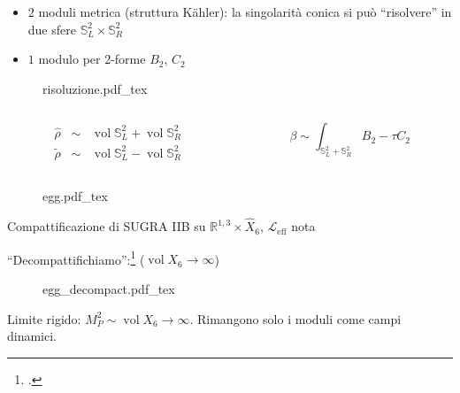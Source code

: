 \documentclass[aspectratio=43,mathserif]{beamer}
\newcommand{\rfour}{\ensuremath{\mathbb{R}^{1,3}}}
\newcommand{\ess}{\mathbb{S}}
\newcommand{\hatt}[1]{\ensuremath{\widehat{#1}}}
\newcommand{\tildd}[1]{\ensuremath{\widetilde{#1}}}
\newcommand{\vol}{\ensuremath{\operatorname{vol}}}
\newcommand{\leff}{\ensuremath{\mathcal{L}_\text{eff}}}
\begin{document}
\begin{frame}
	\begin{itemize}
		\item	$2$ moduli metrica (struttura K\"ahler): la singolarità conica si può ``risolvere'' in due sfere $\ess^2_L \times \ess^2_R$\\
			\vfill
		\item	$1$ modulo per 2-forme $B_2$, $C_2$
	\end{itemize}
	\vspace{-15pt}

	\begin{figure}[h!]\centering
		\def\svgscale{0.5}
		{risoluzione.pdf_tex}
	\end{figure}

	\vspace{-35pt}

	\begin{columns}
		\begin{column}{0.5\textwidth}

			\begin{align}
				\hatt\rho \;\; \sim\;\;  \vol \ess^2_L + \vol \ess^2_R\\
				\tildd\rho \;\; \sim\;\;  \vol \ess^2_L - \vol \ess^2_R
			\end{align}
		\end{column}
		\begin{column}{0.5\textwidth}
			\vfill
			\vspace{10pt}
			\begin{equation}
				\beta \sim \int_{\ess_L^2 + \ess_R^2} B_2 - \tau C_2
				\label{}
			\end{equation}
		\end{column}
	\end{columns}
\end{frame}

\begin{frame}

		\vspace{-10pt}
		\begin{figure}[h!]\centering
		\def\svgscale{0.25}
		{egg.pdf_tex}
		\end{figure}

		\vspace{-10pt}
		Compattificazione di SUGRA IIB su $\rfour \times \hatt X_6$, \; $\leff$ nota

		\vfill

		``Decompattifichiamo'':\footcite{MZ} \quad \quad ($\vol X_6 \rightarrow \infty$)

		\vspace{-10pt}
		\begin{figure}[h!]\centering
		\def\svgscale{0.25}
		{egg_decompact.pdf_tex}
		\end{figure}

		\vspace{-10pt}
		Limite rigido: $M_P^2 \sim \vol X_6 \rightarrow \infty$. Rimangono solo i moduli come campi dinamici.


\end{frame}
\end{document}
